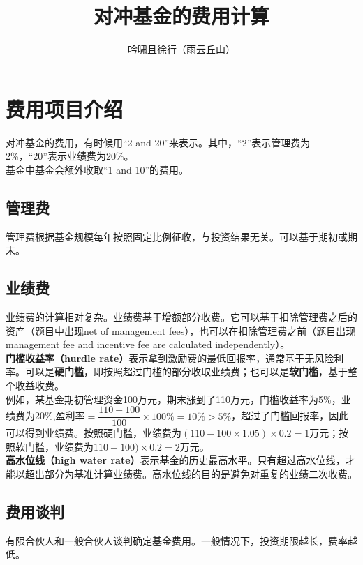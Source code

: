 \documentclass[UTF8]{article}
\title{对冲基金的费用计算}
\author{吟啸且徐行（雨云丘山）}
\date{}
\begin{document}
\maketitle
\section{费用项目介绍}
对冲基金的费用，有时候用“2 and 20”来表示。其中，“2”表示管理费为2\%，“20”表示业绩费为20\%。\\
\indent 基金中基金会额外收取“1 and 10”的费用。
\subsection{管理费}
管理费根据基金规模每年按照固定比例征收，与投资结果无关。可以基于期初或期末。
\subsection{业绩费}
业绩费的计算相对复杂。业绩费基于增额部分收费。它可以基于扣除管理费之后的资产（题目中出现net of management fees），也可以在扣除管理费之前（题目出现management fee and incentive fee are calculated independently）。\\
\indent \textbf{门槛收益率（hurdle rate）}表示拿到激励费的最低回报率，通常基于无风险利率。可以是\textbf{硬门槛}，即按照超过门槛的部分收取业绩费；也可以是\textbf{软门槛}，基于整个收益收费。\\
\indent 例如，某基金期初管理资金100万元，期末涨到了110万元，门槛收益率为5\%，业绩费为20\%,盈利率\(=\dfrac{110-100}{100}\times 100\%=10\%>5\%\)，超过了门槛回报率，因此可以得到业绩费。按照硬门槛，业绩费为\((110-100\times 1.05)\times 0.2=1\)万元；按照软门槛，业绩费为\(110-100)\times 0.2=2\)万元。\\
\indent \textbf{高水位线（high water rate）}表示基金的历史最高水平。只有超过高水位线，才能以超出部分为基准计算业绩费。高水位线的目的是避免对重复的业绩二次收费。
\subsection{费用谈判}
有限合伙人和一般合伙人谈判确定基金费用。一般情况下，投资期限越长，费率越低。
\end{document}
